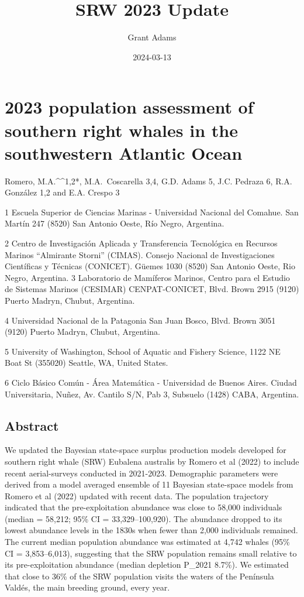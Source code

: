 \documentclass[
]{article}
\title{SRW 2023 Update}
\author{Grant Adams}
\date{2024-03-13}
\begin{document}
\maketitle

\hypertarget{population-assessment-of-southern-right-whales-in-the-southwestern-atlantic-ocean}{%
\section{2023 population assessment of southern right whales in the
southwestern Atlantic
Ocean}\label{population-assessment-of-southern-right-whales-in-the-southwestern-atlantic-ocean}}

Romero, M.A.\^{}\^{}1,2*, M.A.~Coscarella 3,4, G.D. Adams 5, J.C.
Pedraza 6, R.A. González 1,2 and E.A. Crespo 3

1 Escuela Superior de Ciencias Marinas - Universidad Nacional del
Comahue. San Martín 247 (8520) San Antonio Oeste, Río Negro, Argentina.

2 Centro de Investigación Aplicada y Transferencia Tecnológica en
Recursos Marinos ``Almirante Storni'' (CIMAS). Consejo Nacional de
Investigaciones Científicas y Técnicas (CONICET). Güemes 1030 (8520) San
Antonio Oeste, Rio Negro, Argentina. 3 Laboratorio de Mamíferos Marinos,
Centro para el Estudio de Sistemas Marinos (CESIMAR) CENPAT-CONICET,
Blvd. Brown 2915 (9120) Puerto Madryn, Chubut, Argentina.

4 Universidad Nacional de la Patagonia San Juan Bosco, Blvd. Brown 3051
(9120) Puerto Madryn, Chubut, Argentina.

5 University of Washington, School of Aquatic and Fishery Science, 1122
NE Boat St (355020) Seattle, WA, United States.

6 Ciclo Básico Común - Área Matemática - Universidad de Buenos Aires.
Ciudad Universitaria, Nuñez, Av. Cantilo S/N, Pab 3, Subsuelo (1428)
CABA, Argentina.

\hypertarget{abstract}{%
\subsection{Abstract}\label{abstract}}

We updated the Bayesian state-space surplus production models developed
for southern right whale (SRW) Eubalena australis by Romero et al (2022)
to include recent aerial-surveys conducted in 2021-2023. Demographic
parameters were derived from a model averaged ensemble of 11 Bayesian
state-space models from Romero et al (2022) updated with recent data.
The population trajectory indicated that the pre-exploitation abundance
was close to 58,000 individuals (median = 58,212; 95\% CI =
33,329--100,920). The abundance dropped to its lowest abundance levels
in the 1830s when fewer than 2,000 individuals remained. The current
median population abundance was estimated at 4,742 whales (95\% CI =
3,853--6,013), suggesting that the SRW population remains small relative
to its pre-exploitation abundance (median depletion P\_2021 8.7\%). We
estimated that close to 36\% of the SRW population visits the waters of
the Península Valdés, the main breeding ground, every year.
\end{document}
